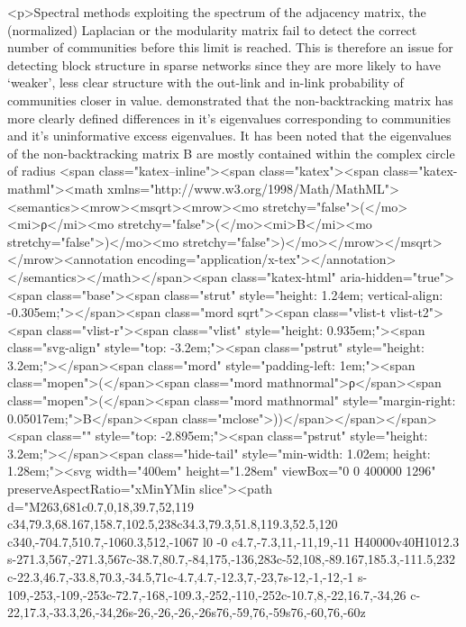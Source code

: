 <p>Spectral methods exploiting the spectrum of the adjacency matrix, the (normalized) Laplacian or the modularity matrix fail to detect the correct number of communities before this limit is reached. This is therefore an issue for detecting block structure in sparse networks since they are more likely to have ‘weaker’, less clear structure with the out-link and in-link probability of communities closer in value.  \cite{Krzakala20935} demonstrated that the non-backtracking matrix has more clearly defined differences in it’s eigenvalues corresponding to communities and it’s uninformative excess eigenvalues. It has been noted that the eigenvalues of the non-backtracking matrix B are mostly contained within the complex circle of radius <span class="katex--inline"><span class="katex"><span class="katex-mathml"><math xmlns="http://www.w3.org/1998/Math/MathML"><semantics><mrow><msqrt><mrow><mo stretchy="false">(</mo><mi>ρ</mi><mo stretchy="false">(</mo><mi>B</mi><mo stretchy="false">)</mo><mo stretchy="false">)</mo></mrow></msqrt></mrow><annotation encoding="application/x-tex"></annotation></semantics></math></span><span class="katex-html" aria-hidden="true"><span class="base"><span class="strut" style="height: 1.24em; vertical-align: -0.305em;"></span><span class="mord sqrt"><span class="vlist-t vlist-t2"><span class="vlist-r"><span class="vlist" style="height: 0.935em;"><span class="svg-align" style="top: -3.2em;"><span class="pstrut" style="height: 3.2em;"></span><span class="mord" style="padding-left: 1em;"><span class="mopen">(</span><span class="mord mathnormal">ρ</span><span class="mopen">(</span><span class="mord mathnormal" style="margin-right: 0.05017em;">B</span><span class="mclose">))</span></span></span><span class="" style="top: -2.895em;"><span class="pstrut" style="height: 3.2em;"></span><span class="hide-tail" style="min-width: 1.02em; height: 1.28em;"><svg width="400em" height="1.28em" viewBox="0 0 400000 1296" preserveAspectRatio="xMinYMin slice"><path d="M263,681c0.7,0,18,39.7,52,119
c34,79.3,68.167,158.7,102.5,238c34.3,79.3,51.8,119.3,52.5,120
c340,-704.7,510.7,-1060.3,512,-1067
l0 -0
c4.7,-7.3,11,-11,19,-11
H40000v40H1012.3
s-271.3,567,-271.3,567c-38.7,80.7,-84,175,-136,283c-52,108,-89.167,185.3,-111.5,232
c-22.3,46.7,-33.8,70.3,-34.5,71c-4.7,4.7,-12.3,7,-23,7s-12,-1,-12,-1
s-109,-253,-109,-253c-72.7,-168,-109.3,-252,-110,-252c-10.7,8,-22,16.7,-34,26
c-22,17.3,-33.3,26,-34,26s-26,-26,-26,-26s76,-59,76,-59s76,-60,76,-60z
